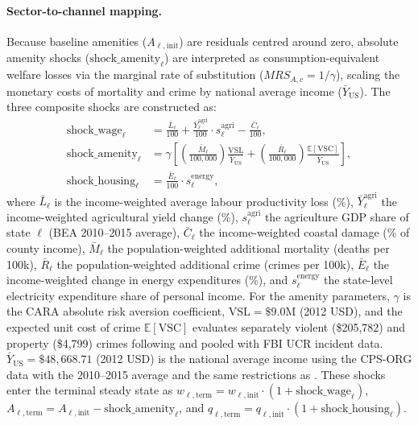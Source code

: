 \documentclass[11pt, a4paper]{article}
\begin{document}
\paragraph{Sector-to-channel mapping.} Because baseline amenities ($A_{\ell, \text{init}}$) are residuals centred around zero, absolute amenity shocks ($\text{shock\_amenity}_\ell$) are interpreted as consumption-equivalent welfare losses via the marginal rate of substitution ($MRS_{A,c} = 1/\gamma$), scaling the monetary costs of mortality and crime by national average income ($\bar{Y}_{\text{US}}$). The three composite shocks are constructed as:
\begin{align}
  \text{shock\_wage}_\ell &= \frac{\bar L_\ell}{100}
    + \frac{\bar Y_\ell^{\text{agri}}}{100} \cdot s_\ell^{\text{agri}}
    - \frac{\bar C_\ell}{100}, \label{eq:shock_wage} \\
  \text{shock\_amenity}_\ell &= \gamma \left[ \left(\frac{\bar M_\ell}{100{,}000}\right) \frac{\text{VSL}}{\bar{Y}_{\text{US}}} + \left(\frac{\bar R_\ell}{100{,}000}\right) \frac{\mathbb{E}[\text{VSC}]}{\bar{Y}_{\text{US}}} \right], \label{eq:shock_amenity} \\
  \text{shock\_housing}_\ell &= \frac{\bar E_\ell}{100} \cdot s_\ell^{\text{energy}}, \label{eq:shock_housing}
\end{align}
where $\bar L_\ell$ is the income-weighted average labour productivity loss (\%), $\bar Y_\ell^{\text{agri}}$ the income-weighted agricultural yield change (\%), $s_\ell^{\text{agri}}$ the agriculture GDP share of state $\ell$ (BEA 2010--2015 average), $\bar C_\ell$ the income-weighted coastal damage (\% of county income), $\bar M_\ell$ the population-weighted additional mortality (deaths per 100k), $\bar R_\ell$ the population-weighted additional crime (crimes per 100k), $\bar E_\ell$ the income-weighted change in energy expenditures (\%), and $s_\ell^{\text{energy}}$ the state-level electricity expenditure share of personal income. For the amenity parameters, $\gamma$ is the CARA absolute risk aversion coefficient, $\text{VSL} = \$9.0\text{M}$ (2012 USD), and the expected unit cost of crime $\mathbb{E}[\text{VSC}]$ evaluates separately violent (\$205,782) and property (\$4,799) crimes following \citet{mccollister_cost_2010} and pooled with FBI UCR incident data. $\bar{Y}_{\text{US}} = \$48,668.71$ (2012 USD) is the national average income using the CPS-ORG data with the 2010--2015 average and the same restrictions as \citet{dvorkin_geography_2025}. These shocks enter the terminal steady state as $w_{\ell, \text{term}} = w_{\ell, \text{init}} \cdot (1 + \text{shock\_wage}_\ell)$, $A_{\ell, \text{term}} = A_{\ell, \text{init}} - \text{shock\_amenity}_\ell$, and $q_{\ell, \text{term}} = q_{\ell, \text{init}} \cdot (1 + \text{shock\_housing}_\ell)$.
\end{document}
